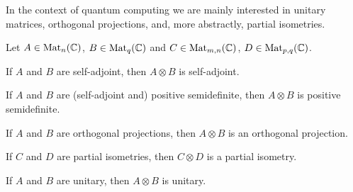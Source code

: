 \documentclass[a4paper, oneside, 12pt]{amsart}
\begin{document}
In the context of quantum computing we are mainly interested in unitary matrices, orthogonal projections, and, more abstractly, partial isometries.

\begin{lemma}\label{lem:matrix-properties}
  Let \( A \in \operatorname{Mat}_n(\mathbb{C}) \), \( B \in \operatorname{Mat}_q(\mathbb{C}) \) and
  \(C \in \operatorname{Mat}_{m,n}( \mathbb{C})\), \( D \in \operatorname{Mat}_{p,q}( \mathbb{C})\).
  \begin{thmlist}
    \item If \( A \) and \( B \) are self-adjoint, then \( A \otimes B \) is self-adjoint.
    \item If \( A \) and \( B \) are (self-adjoint and) positive semidefinite, then \( A \otimes B \) is positive semidefinite.
    \item If \( A \) and \( B \) are orthogonal projections, then \( A \otimes B \) is an orthogonal projection.
    \item If \( C \) and \( D \) are partial isometries, then \( C \otimes D \) is a partial isometry.
    \item If \( A \) and \( B \) are unitary, then \( A \otimes B \) is unitary.
  \end{thmlist}
\end{lemma}
\end{document}
